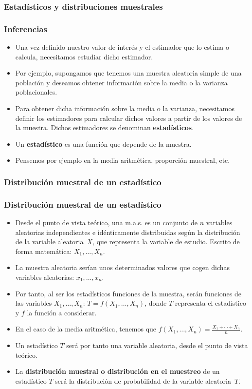 \subsubsection{Estadísticos y distribuciones muestrales} 

\begin{frame}
\frametitle{Inferencias}
\begin{itemize}
\item Una vez definido nuestro valor de interés y el estimador que lo estima o calcula, necesitamos estudiar dicho estimador.
\item Por ejemplo, supongamos que tenemos una muestra aleatoria simple de una población y deseamos obtener información sobre la media o 
la varianza poblacionales. 
\item Para obtener dicha información sobre la media o la varianza, necesitamos definir los estimadores para calcular dichos valores a partir de los
valores de la muestra. Dichos estimadores se denominan \textbf{estadísticos}.
\item Un \textbf{estadístico} es una función que depende de la
muestra.
\item  Pensemos por ejemplo en la media aritmética, proporción muestral, etc.
\end{itemize}
\end{frame}

\subsubsection{Distribución muestral de un estadístico}

\begin{frame}
\frametitle{Distribución muestral de un estadístico}
\begin{itemize}
\item Desde el punto de vista teórico, una m.a.s. es un conjunto de $n$ variables aleatorias independientes e idénticamente distribuidas según 
la distribución de la variable aleatoria~$X$, que representa la variable de estudio. Escrito de forma
matemática: $X_1,\ldots, X_n$.
\item La muestra aleatoria serían unos determinados valores que cogen dichas variables aleatorias: $x_1,\ldots,x_n$.
\item Por tanto, al ser los estadísticos funciones de la muestra, serán funciones de las variables $X_1,\ldots,X_n$: $T=f(X_1,\ldots,X_n)$, donde $T$ 
representa el estadístico y $f$ la función a considerar.
\item En el caso de la media aritmética, tenemos que $f(X_1,\ldots,X_n)=\frac{X_1+\cdots +X_n}{n}$.
\item Un estadístico $T$ será por tanto una variable aleatoria, desde el punto de vista teórico.
\item La \textbf{distribución muestral o distribución en el muestreo} de un estadístico $T$ será la
distribución de probabilidad de la variable aleatoria~$T$.
\end{itemize}
\end{frame}

